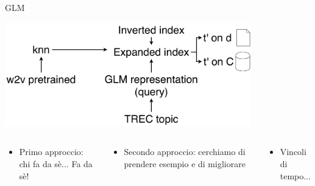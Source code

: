 \begin{frame}{GLM}
    \begin{center}
        \includegraphics[width=0.8\textwidth]{img/reproduction.pdf}
    \end{center}
    \begin{columns}
        \begin{column}{0.33\textwidth}
            \begin{itemize}
                \item Primo approccio: chi fa da sè... Fa da sè!
            \end{itemize}
        \end{column}
        \begin{column}{0.33\textwidth}
            \begin{itemize}
                \item Secondo approccio: cerchiamo di prendere esempio e di migliorare
            \end{itemize}
        \end{column}
        \begin{column}{0.33\textwidth}
            \begin{itemize}
                \item Vincoli di tempo...
            \end{itemize}
        \end{column}
    \end{columns}
\end{frame}
